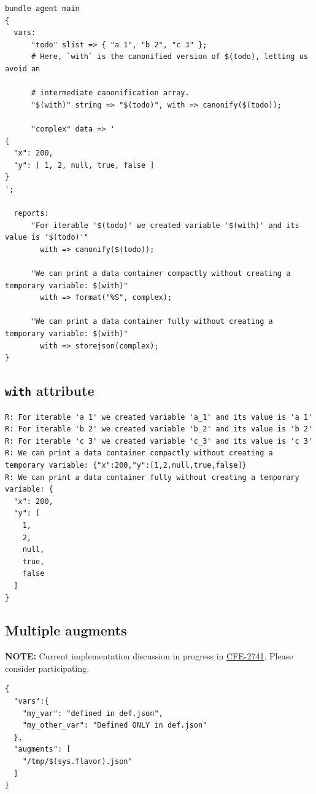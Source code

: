 \documentclass[11pt]{article}
\begin{document}
\begin{verbatim}
bundle agent main
{
  vars:
      "todo" slist => { "a 1", "b 2", "c 3" };
      # Here, `with` is the canonified version of $(todo), letting us avoid an

      # intermediate canonification array.
      "$(with)" string => "$(todo)", with => canonify($(todo));

      "complex" data => '
{
  "x": 200,
  "y": [ 1, 2, null, true, false ]
}
';

  reports:
      "For iterable '$(todo)' we created variable '$(with)' and its value is '$(todo)'"
        with => canonify($(todo));

      "We can print a data container compactly without creating a temporary variable: $(with)"
        with => format("%S", complex);

      "We can print a data container fully without creating a temporary variable: $(with)"
        with => storejson(complex);
}
\end{verbatim}

\subsection*{\texttt{with} attribute}
\label{sec:orgb02338b}

\begin{verbatim}
R: For iterable 'a 1' we created variable 'a_1' and its value is 'a 1'
R: For iterable 'b 2' we created variable 'b_2' and its value is 'b 2'
R: For iterable 'c 3' we created variable 'c_3' and its value is 'c 3'
R: We can print a data container compactly without creating a temporary variable: {"x":200,"y":[1,2,null,true,false]}
R: We can print a data container fully without creating a temporary variable: {
  "x": 200,
  "y": [
    1,
    2,
    null,
    true,
    false
  ]
}
\end{verbatim}
\subsection*{Multiple augments}
\label{sec:org9dd5cb9}

\textbf{NOTE:} Current implementation discussion in progress in \href{https://tracker.mender.io/browse/CFE-2741}{CFE-2741}. Please
consider participating.

\begin{verbatim}
{
  "vars":{
    "my_var": "defined in def.json",
    "my_other_var": "Defined ONLY in def.json"
  },
  "augments": [
    "/tmp/$(sys.flavor).json"
  ]
}
\end{verbatim}
\end{document}
